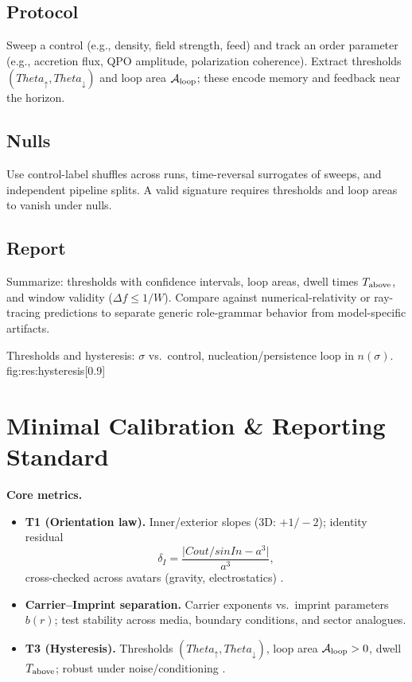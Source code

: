 \documentclass[12pt,a4paper,oneside]{scrreprt}
\def\Cout{Cout}%
\def\sinIn{sinIn}%
\def\Theta{Theta}%
\newcommand{\sinIn}{s_{\mathrm{in}}}
\newcommand{\Cout}{C_{\mathrm{out}}}
\begin{document}
\section*{Protocol}
Sweep a control (e.g., density, field strength, feed) and track an order parameter (e.g., accretion flux, QPO amplitude, polarization coherence).  
Extract thresholds $(\Theta_\uparrow,\Theta_\downarrow)$ and loop area $\mathcal A_{\rm loop}$; these encode memory and feedback near the horizon.

\section*{Nulls}
Use control-label shuffles across runs, time-reversal surrogates of sweeps, and independent pipeline splits.  
A valid signature requires thresholds and loop areas to vanish under nulls.

\section*{Report}
Summarize: thresholds with confidence intervals, loop areas, dwell times $T_{\rm above}$, and window validity ($\Delta f\le 1/W$).  
Compare against numerical-relativity or ray-tracing predictions to separate generic role-grammar behavior from model-specific artifacts.

       {Thresholds and hysteresis: $\sigma$ vs.\ control, nucleation/persistence loop in $n(\sigma)$.}
       {fig:res:hysteresis}[0.9]

\chapter*{Minimal Calibration \& Reporting Standard}

\noindent\textbf{Core metrics.}
\begin{itemize}\setlength\itemsep{0.3em}
\item \textbf{T1 (Orientation law).} Inner/exterior slopes (3D: $+1/-2$); identity residual 
\[
\delta_I=\frac{\big|\Cout/\sinIn-a^3\big|}{a^3},
\] 
cross-checked across avatars (gravity, electrostatics) \cite{Jackson1999,Griffiths2017}.
\item \textbf{Carrier–Imprint separation.} Carrier exponents vs.\ imprint parameters $b(r)$; test stability across media, boundary conditions, and sector analogues.
\item \textbf{T3 (Hysteresis).} Thresholds $(\Theta_\uparrow,\Theta_\downarrow)$, loop area $\mathcal A_{\rm loop}>0$, dwell $T_{\rm above}$; robust under noise/conditioning \cite{Strogatz2018,Kadanoff2000}.
\end{itemize}
\end{document}
